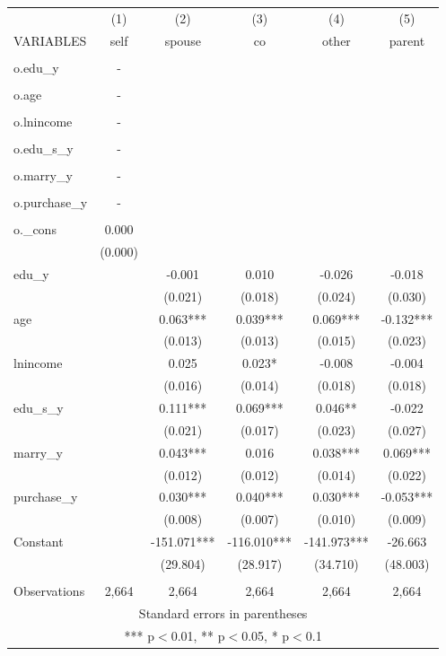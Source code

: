 \begin{tabular}{lccccc} \hline
 & (1) & (2) & (3) & (4) & (5) \\
VARIABLES & self & spouse & co & other & parent \\ \hline
 &  &  &  &  &  \\
o.edu\_y & - &  &  &  &  \\
 &  &  &  &  &  \\
o.age & - &  &  &  &  \\
 &  &  &  &  &  \\
o.lnincome & - &  &  &  &  \\
 &  &  &  &  &  \\
o.edu\_s\_y & - &  &  &  &  \\
 &  &  &  &  &  \\
o.marry\_y & - &  &  &  &  \\
 &  &  &  &  &  \\
o.purchase\_y & - &  &  &  &  \\
 &  &  &  &  &  \\
o.\_cons & 0.000 &  &  &  &  \\
 & (0.000) &  &  &  &  \\
edu\_y &  & -0.001 & 0.010 & -0.026 & -0.018 \\
 &  & (0.021) & (0.018) & (0.024) & (0.030) \\
age &  & 0.063*** & 0.039*** & 0.069*** & -0.132*** \\
 &  & (0.013) & (0.013) & (0.015) & (0.023) \\
lnincome &  & 0.025 & 0.023* & -0.008 & -0.004 \\
 &  & (0.016) & (0.014) & (0.018) & (0.018) \\
edu\_s\_y &  & 0.111*** & 0.069*** & 0.046** & -0.022 \\
 &  & (0.021) & (0.017) & (0.023) & (0.027) \\
marry\_y &  & 0.043*** & 0.016 & 0.038*** & 0.069*** \\
 &  & (0.012) & (0.012) & (0.014) & (0.022) \\
purchase\_y &  & 0.030*** & 0.040*** & 0.030*** & -0.053*** \\
 &  & (0.008) & (0.007) & (0.010) & (0.009) \\
Constant &  & -151.071*** & -116.010*** & -141.973*** & -26.663 \\
 &  & (29.804) & (28.917) & (34.710) & (48.003) \\
 &  &  &  &  &  \\
 Observations & 2,664 & 2,664 & 2,664 & 2,664 & 2,664 \\ \hline
\multicolumn{6}{c}{ Standard errors in parentheses} \\
\multicolumn{6}{c}{ *** p$<$0.01, ** p$<$0.05, * p$<$0.1} \\
\end{tabular}
